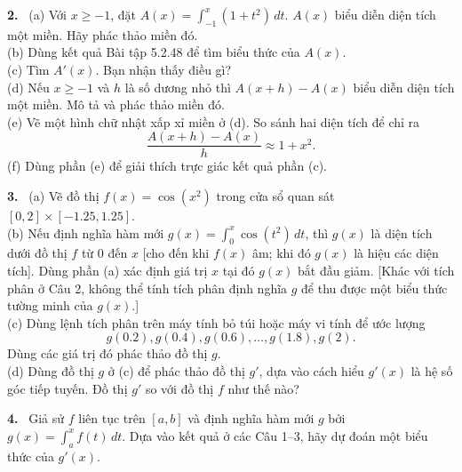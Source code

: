 \documentclass[12pt,a4paper]{article}
\newcommand{\bt}[1]{\par\smallskip\Needspace{5\baselineskip}\noindent\textbf{#1.}\ }
\newcommand{\da}[1]{\bt{#1}}
\begin{document}
\da{2} (a) Với $x\ge-1$, đặt $A(x)=\int_{-1}^x(1+t^2)\,dt$. $A(x)$ biểu diễn diện tích một miền. Hãy phác thảo miền đó.\\(b) Dùng kết quả Bài tập 5.2.48 để tìm biểu thức của $A(x)$.\\(c) Tìm $A'(x)$. Bạn nhận thấy điều gì?\\(d) Nếu $x\ge-1$ và $h$ là số dương nhỏ thì $A(x+h)-A(x)$ biểu diễn diện tích một miền. Mô tả và phác thảo miền đó.\\(e) Vẽ một hình chữ nhật xấp xỉ miền ở (d). So sánh hai diện tích để chỉ ra
\[\frac{A(x+h)-A(x)}h\approx1+x^2.\]
(f) Dùng phần (e) để giải thích trực giác kết quả phần (c).
\da{3} (a) Vẽ đồ thị $f(x)=\cos(x^2)$ trong cửa sổ quan sát $[0,2]\times[-1.25,1.25]$.\\(b) Nếu định nghĩa hàm mới $g(x)=\int_0^x\cos(t^2)\,dt$, thì $g(x)$ là diện tích dưới đồ thị $f$ từ 0 đến $x$ [cho đến khi $f(x)$ âm; khi đó $g(x)$ là hiệu các diện tích]. Dùng phần (a) xác định giá trị $x$ tại đó $g(x)$ bắt đầu giảm. [Khác với tích phân ở Câu 2, không thể tính tích phân định nghĩa $g$ để thu được một biểu thức tường minh của $g(x)$.]\\(c) Dùng lệnh tích phân trên máy tính bỏ túi hoặc máy vi tính để ước lượng
\[g(0.2),g(0.4),g(0.6),\ldots,g(1.8),g(2).\]
Dùng các giá trị đó phác thảo đồ thị $g$.\\(d) Dùng đồ thị $g$ ở (c) để phác thảo đồ thị $g'$, dựa vào cách hiểu $g'(x)$ là hệ số góc tiếp tuyến. Đồ thị $g'$ so với đồ thị $f$ như thế nào?
\da{4} Giả sử $f$ liên tục trên $[a,b]$ và định nghĩa hàm mới $g$ bởi $g(x)=\int_a^x f(t)\,dt$. Dựa vào kết quả ở các Câu 1–3, hãy dự đoán một biểu thức của $g'(x)$.
\end{document}
